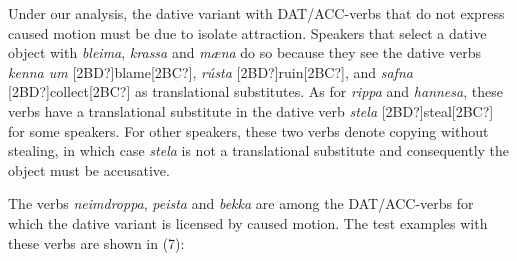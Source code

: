 \begin{styleStandard}
Under our analysis, the dative variant with DAT/ACC-verbs that do not express caused motion must be due to isolate attraction. Speakers that select a dative object with \textit{bleima}, \textit{krassa} and \textit{mæna} do so because they see the dative verbs \textit{kenna um} [2BD?]blame[2BC?], \textit{rústa} [2BD?]ruin[2BC?], and \textit{safna} [2BD?]collect[2BC?] as translational substitutes. As for \textit{rippa} and \textit{hannesa}, these verbs have a translational substitute in the dative verb \textit{stela} [2BD?]steal[2BC?] for some speakers. For other speakers, these two verbs denote copying without stealing, in which case \textit{stela} is not a translational substitute and consequently the object must be accusative. 
\end{styleStandard}

\begin{styleStandard}
The verbs \textit{neimdroppa}, \textit{peista} and \textit{bekka} are among the DAT/ACC-verbs for which the dative variant is licensed by caused motion. The test examples with these verbs are shown in (7):
\end{styleStandard}

